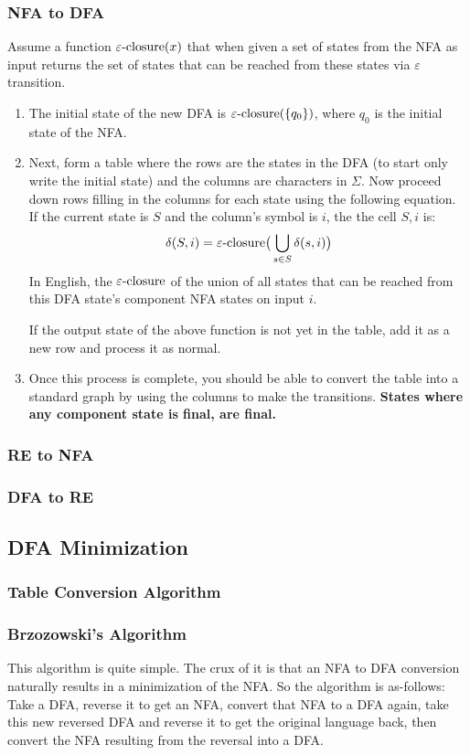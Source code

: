 \subsubsection{NFA to DFA}
Assume a function $\varepsilon\text{-closure}(x)$ that when given a set of states from the
NFA as input returns the set of states that can be reached from these states
via $\varepsilon$ transition.
\begin{enumerate}
    \item The initial state of the new DFA is $\varepsilon\text{-closure}(\{q_0\})$, where $q_0$ is
    the initial state of the NFA.
    \item Next, form a table where the rows are the states in the DFA (to start
    only write the initial state) and the columns are characters in $\Sigma$.
    Now proceed down rows filling in the columns for each state using the following
    equation. If the current state is $S$ and the column's symbol is $i$, the
    the cell $S, i$ is:
    \[
        \delta(S, i) = \varepsilon\text{-closure}\big(\bigcup_{s \in S} \delta(s, i)\big)
    \]
    In English, the $\varepsilon\text{-closure}$ of the union of all states that can be reached 
    from this DFA state's component NFA states on input $i$.

    If the output state of the above function is not yet in the table, add it
    as a new row and process it as normal.
    \item Once this process is complete, you should be able to convert the
    table into a standard graph by using the columns to make the transitions.
    \textbf{States where any component state is final, are final.}
\end{enumerate}
\subsubsection{RE to NFA}
\subsubsection{DFA to RE}

\subsection{DFA Minimization}

    \subsubsection{Table Conversion Algorithm}
    \subsubsection{Brzozowski's Algorithm}
    This algorithm is quite simple. The crux of it is that an NFA to DFA conversion
    naturally results in a minimization of the NFA. So the algorithm is as-follows:
    Take a DFA, reverse it to get an NFA, convert that NFA to a DFA again, take
    this new reversed DFA and reverse it to get the original language back, then
    convert the NFA resulting from the reversal into a DFA.
